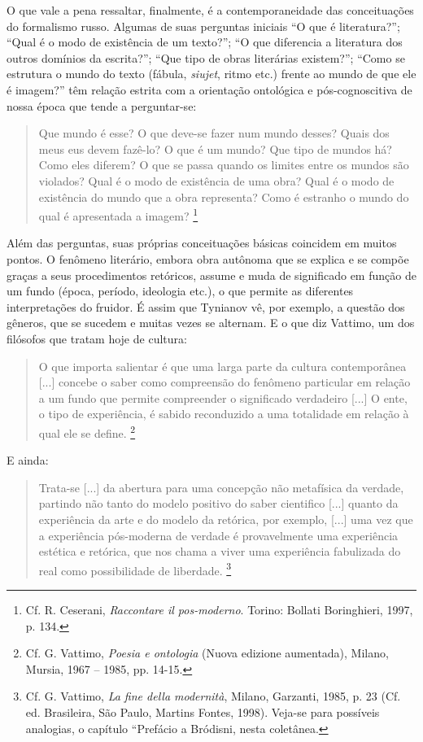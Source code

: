 O que vale a pena ressaltar, finalmente, é a contemporaneidade das
conceituações do formalismo russo. Algumas de suas perguntas iniciais
``O que é literatura?''; ``Qual é o modo de existência de um texto?'';
``O que diferencia a literatura dos outros domínios da escrita?''; ``Que
tipo de obras literárias existem?''; ``Como se estrutura o mundo do
texto (fábula, \emph{siujet}, ritmo etc.) frente ao mundo de que ele é
imagem?'' têm relação estrita com a orientação ontológica e
pós-cognoscitiva de nossa época que tende a perguntar-se:

\begin{quote}
Que mundo é esse? O que deve-se fazer num mundo desses? Quais dos meus
eus devem fazê-lo? O que é um mundo? Que tipo de mundos há? Como eles
diferem? O que se passa quando os limites entre os mundos são violados?
Qual é o modo de existência de uma obra? Qual é o modo de existência do
mundo que a obra representa? Como é estranho o mundo do qual é
apresentada a imagem? \footnote{Cf. R. Ceserani, \emph{Raccontare il
  pos-moderno}. Torino: Bollati Boringhieri, 1997, p. 134.}
\end{quote}

Além das perguntas, suas próprias conceituações básicas coincidem em
muitos pontos. O fenômeno literário, embora obra autônoma que se explica
e se compõe graças a seus procedimentos retóricos, assume e muda de
significado em função de um fundo (época, período, ideologia etc.), o
que permite as diferentes interpretações do fruidor. É assim que
Tynianov vê, por exemplo, a questão dos gêneros, que se sucedem e muitas
vezes se alternam. E o que diz Vattimo, um dos filósofos que tratam hoje
de cultura:

\begin{quote}
O que importa salientar é que uma larga parte da cultura contemporânea
{[}...{]} concebe o saber como compreensão do fenômeno particular em
relação a um fundo que permite compreender o significado verdadeiro
{[}...{]} O ente, o tipo de experiência, é sabido reconduzido a uma
totalidade em relação à qual ele se define. \footnote{Cf. G. Vattimo,
  \emph{Poesia e ontologia} (Nuova edizione aumentada), Milano, Mursia,
  1967 -- 1985, pp. 14-15.}
\end{quote}

E ainda:

\begin{quote}
Trata-se {[}...{]} da abertura para uma concepção não metafísica da
verdade, partindo não tanto do modelo positivo do saber cientifico
{[}...{]} quanto da experiência da arte e do modelo da retórica, por
exemplo, {[}...{]} uma vez que a experiência pós-moderna de verdade é
provavelmente uma experiência estética e retórica, que nos chama a viver
uma experiência fabulizada do real como possibilidade de liberdade.
\footnote{Cf. G. Vattimo, \emph{La fine della modernità}, Milano,
  Garzanti, 1985, p. 23 (Cf. ed. Brasileira, São Paulo, Martins Fontes,
  1998). Veja-se para possíveis analogias, o capítulo ``Prefácio a
  Bródisni, nesta coletânea.}
\end{quote}

